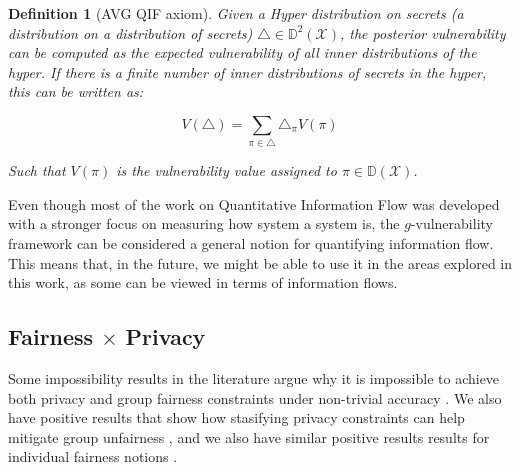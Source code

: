 \documentclass[conference]{IEEEtran}
\newtheorem{definition}{Definition}
\newcommand{\DX}{\mathbb{D}(\mathcal{X})}
\newcommand{\DDX}{\mathbb{D}^2(\mathcal{X})}
\begin{document}
\begin{definition}[AVG QIF axiom]\label{def:aQIF} Given a Hyper distribution on secrets (a distribution on a distribution of secrets) $\triangle \in \DDX$, the posterior vulnerability can be computed as the expected vulnerability of all inner distributions of the hyper. If there is a finite number of inner distributions of secrets in the hyper, this can be written as:

$$V(\triangle) = \sum\limits_{\pi \in \triangle}\triangle_\pi V(\pi)$$

Such that $V(\pi)$ is the vulnerability value assigned to $\pi \in \DX$.
\end{definition}

Even though most of the work on Quantitative Information Flow was developed with a stronger focus on measuring how system a system is, the $g$-vulnerability framework can be considered a general notion for quantifying information flow. This means that, in the future, we might be able to use it in the areas explored in this work, as some can be viewed in terms of information flows.



\subsection{Fairness $\times$ Privacy}

Some impossibility results in the literature argue why it is impossible to achieve both privacy and group fairness constraints under non-trivial accuracy \cite{Rachel}. We also have positive results that show how stasifying privacy constraints can help mitigate group unfairness \cite{makhlouf2024systematicformalstudyimpact}\cite{makhlouf2024impact}\cite{arcolezi2023local}, and we also have similar positive results results for individual fairness notions \cite{Awareness}.
\end{document}
